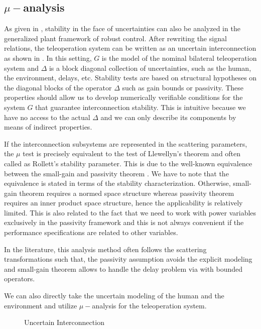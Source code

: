 \subsection{$\mu-$analysis}
As given in , stability in the face of uncertainties can also be analyzed in the generalized plant framework 
of robust control. After rewriting the signal relations, the teleoperation system can be written as an uncertain interconnection as 
shown in . In this setting, $G$ is the model of the nominal bilateral teleoperation system and $\Delta$ 
is a block diagonal collection of uncertainties, such as the human, the environment, delays, etc. Stability tests are based on structural 
hypotheses on the diagonal blocks of the operator $\Delta$ such as gain bounds or passivity. These properties should allow us to develop 
numerically verifiable conditions for the system $G$ that guarantee interconnection stability. This is intuitive because we have no access 
to the actual $\Delta$ and we can only describe its components by means of indirect properties. 

If the interconnection subsystems are represented in the scattering parameters, the $\mu$ test is precisely equivalent to the test of
Llewellyn's theorem and often called as Rollett's stability parameter. This is due to the well-known equivalence between the small-gain 
and passivity theorem \cite{desvid}. We have to note that the equivalence is stated in terms of the stability characterization. Otherwise, 
small-gain theorem requires a normed space structure whereas passivity theorem requires an inner product space structure, hence the 
applicability is relatively limited. This is also related to the fact that we need to work with power variables exclusively in the 
passivity framework and this is not always convenient if the performance specifications are related to other variables.

In the literature, this analysis method often follows the scattering transformations such that, the passivity assumption avoids the
explicit modeling and small-gain theorem allows to handle the delay problem via with bounded operators.


We can also directly take the uncertain modeling of the human and the environment and utilize $\mu-$analysis for the teleoperation
system. 



\begin{figure}%
\centering%
\caption{Uncertain Interconnection}%
\label{fig:lit:uncincgeneral}%
\end{figure}



